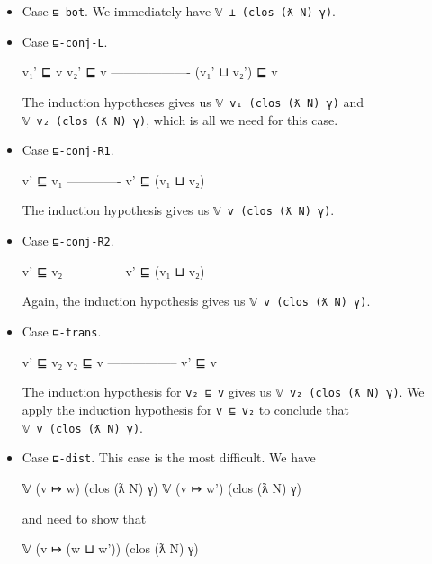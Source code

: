 \begin{itemize}
\item
  Case \texttt{⊑-bot}. We immediately have
  \texttt{𝕍\ ⊥\ (clos\ (ƛ\ N)\ γ)}.
\item
  Case \texttt{⊑-conj-L}.

  \begin{myDisplay}
    v₁' ⊑ v     v₂' ⊑ v
    -------------------
    (v₁' ⊔ v₂') ⊑ v
  \end{myDisplay}

  The induction hypotheses gives us
  \texttt{𝕍\ v₁\textquotesingle{}\ (clos\ (ƛ\ N)\ γ)} and
  \texttt{𝕍\ v₂\textquotesingle{}\ (clos\ (ƛ\ N)\ γ)}, which is all we
  need for this case.
\item
  Case \texttt{⊑-conj-R1}.

  \begin{myDisplay}
    v' ⊑ v₁
    -------------
    v' ⊑ (v₁ ⊔ v₂)
  \end{myDisplay}

  The induction hypothesis gives us
  \texttt{𝕍\ v\textquotesingle{}\ (clos\ (ƛ\ N)\ γ)}.
\item
  Case \texttt{⊑-conj-R2}.

  \begin{myDisplay}
    v' ⊑ v₂
    -------------
    v' ⊑ (v₁ ⊔ v₂)
  \end{myDisplay}

  Again, the induction hypothesis gives us
  \texttt{𝕍\ v\textquotesingle{}\ (clos\ (ƛ\ N)\ γ)}.
\item
  Case \texttt{⊑-trans}.

  \begin{myDisplay}
    v' ⊑ v₂   v₂ ⊑ v
    -----------------
         v' ⊑ v
  \end{myDisplay}

  The induction hypothesis for \texttt{v₂\ ⊑\ v} gives us
  \texttt{𝕍\ v₂\ (clos\ (ƛ\ N)\ γ)}. We apply the induction hypothesis
  for \texttt{v\textquotesingle{}\ ⊑\ v₂} to conclude that
  \texttt{𝕍\ v\textquotesingle{}\ (clos\ (ƛ\ N)\ γ)}.
\item
  Case \texttt{⊑-dist}. This case is the most difficult. We have

  \begin{myDisplay}
    𝕍 (v ↦ w) (clos (ƛ N) γ)
    𝕍 (v ↦ w') (clos (ƛ N) γ)
  \end{myDisplay}

  and need to show that

  \begin{myDisplay}
    𝕍 (v ↦ (w ⊔ w')) (clos (ƛ N) γ)
  \end{myDisplay}


\end{itemize}
